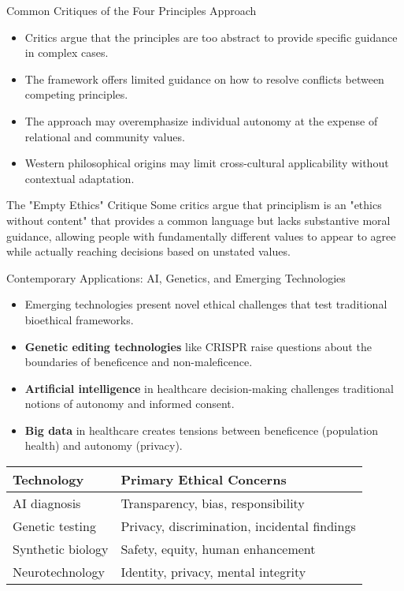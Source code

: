 \documentclass{beamer}
\begin{document}
	\begin{frame}{Common Critiques of the Four Principles Approach}
		\begin{itemize}
			\item Critics argue that the principles are too abstract to provide specific guidance in complex cases.
			\item The framework offers limited guidance on how to resolve conflicts between competing principles.
			\item The approach may overemphasize individual autonomy at the expense of relational and community values.
			\item Western philosophical origins may limit cross-cultural applicability without contextual adaptation.
		\end{itemize}
		
		\begin{alertblock}{The "Empty Ethics" Critique}
			Some critics argue that principlism is an "ethics without content" that provides a common language but lacks substantive moral guidance, allowing people with fundamentally different values to appear to agree while actually reaching decisions based on unstated values.
		\end{alertblock}
	\end{frame}
	
	\begin{frame}{Contemporary Applications: AI, Genetics, and Emerging Technologies}
		\begin{itemize}
			\item Emerging technologies present novel ethical challenges that test traditional bioethical frameworks.
			\item \textbf{Genetic editing technologies} like CRISPR raise questions about the boundaries of beneficence and non-maleficence.
			\item \textbf{Artificial intelligence} in healthcare decision-making challenges traditional notions of autonomy and informed consent.
			\item \textbf{Big data} in healthcare creates tensions between beneficence (population health) and autonomy (privacy).
		\end{itemize}
		
		\begin{table}
			\begin{tabular}{l|l}
				\textbf{Technology} & \textbf{Primary Ethical Concerns} \\
				\hline
				AI diagnosis & Transparency, bias, responsibility \\
				Genetic testing & Privacy, discrimination, incidental findings \\
				Synthetic biology & Safety, equity, human enhancement \\
				Neurotechnology & Identity, privacy, mental integrity \\
			\end{tabular}
		\end{table}
	\end{frame}
	
\end{document}
